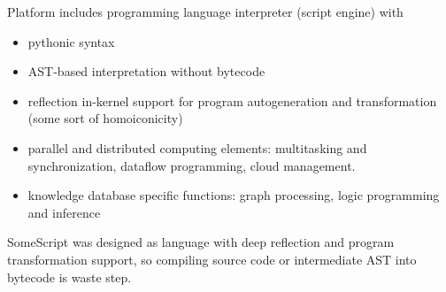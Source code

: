 \secdown

Platform includes programming language interpreter (script engine) with

\begin{itemize}[nosep]
  \item 
pythonic syntax
  \item 
AST-based interpretation without bytecode
  \item 
reflection in-kernel support for program autogeneration and transformation (some
sort of homoiconicity)
  \item 
parallel and distributed computing elements: multitasking and synchronization,
dataflow programming, cloud management.
  \item 
knowledge database specific functions: graph processing, logic programming and
inference
\end{itemize}

\bigskip
SomeScript was designed as language with deep reflection and program
transformation support, so compiling source code or intermediate AST into
bytecode is waste step.

\secup